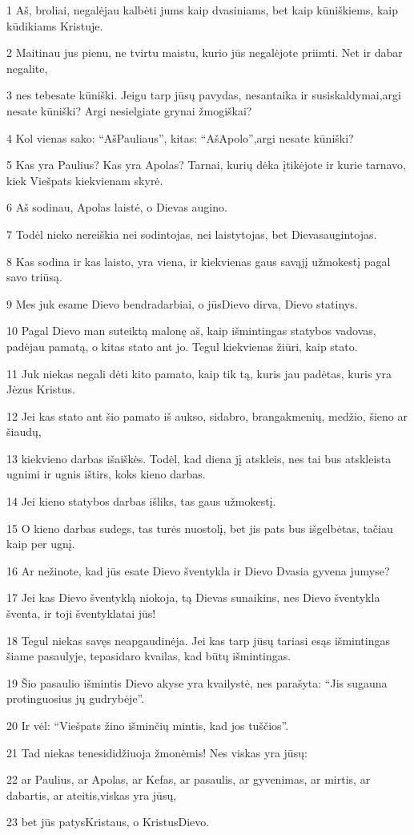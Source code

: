 \par 1 Aš, broliai, negalėjau kalbėti jums kaip dvasiniams, bet kaip kūniškiems, kaip kūdikiams Kristuje. 
\par 2 Maitinau jus pienu, ne tvirtu maistu, kurio jūs negalėjote priimti. Net ir dabar negalite, 
\par 3 nes tebesate kūniški. Jeigu tarp jūsų pavydas, nesantaika ir susiskaldymai,­argi nesate kūniški? Argi nesielgiate grynai žmogiškai? 
\par 4 Kol vienas sako: “Aš­Pauliaus”, kitas: “Aš­Apolo”,­argi nesate kūniški? 
\par 5 Kas yra Paulius? Kas yra Apolas? Tarnai, kurių dėka įtikėjote ir kurie tarnavo, kiek Viešpats kiekvienam skyrė. 
\par 6 Aš sodinau, Apolas laistė, o Dievas augino. 
\par 7 Todėl nieko nereiškia nei sodintojas, nei laistytojas, bet Dievas­augintojas. 
\par 8 Kas sodina ir kas laisto, yra viena, ir kiekvienas gaus savąjį užmokestį pagal savo triūsą. 
\par 9 Mes juk esame Dievo bendradarbiai, o jūs­Dievo dirva, Dievo statinys. 
\par 10 Pagal Dievo man suteiktą malonę aš, kaip išmintingas statybos vadovas, padėjau pamatą, o kitas stato ant jo. Tegul kiekvienas žiūri, kaip stato. 
\par 11 Juk niekas negali dėti kito pamato, kaip tik tą, kuris jau padėtas, kuris yra Jėzus Kristus. 
\par 12 Jei kas stato ant šio pamato iš aukso, sidabro, brangakmenių, medžio, šieno ar šiaudų,­ 
\par 13 kiekvieno darbas išaiškės. Todėl, kad diena jį atskleis, nes tai bus atskleista ugnimi ir ugnis ištirs, koks kieno darbas. 
\par 14 Jei kieno statybos darbas išliks, tas gaus užmokestį. 
\par 15 O kieno darbas sudegs, tas turės nuostolį, bet jis pats bus išgelbėtas, tačiau kaip per ugnį. 
\par 16 Ar nežinote, kad jūs esate Dievo šventykla ir Dievo Dvasia gyvena jumyse? 
\par 17 Jei kas Dievo šventyklą niokoja, tą Dievas sunaikins, nes Dievo šventykla šventa, ir toji šventykla­tai jūs! 
\par 18 Tegul niekas savęs neapgaudinėja. Jei kas tarp jūsų tariasi esąs išmintingas šiame pasaulyje, tepasidaro kvailas, kad būtų išmintingas. 
\par 19 Šio pasaulio išmintis Dievo akyse yra kvailystė, nes parašyta: “Jis sugauna protinguosius jų gudrybėje”. 
\par 20 Ir vėl: “Viešpats žino išminčių mintis, kad jos tuščios”. 
\par 21 Tad niekas tenesididžiuoja žmonėmis! Nes viskas yra jūsų: 
\par 22 ar Paulius, ar Apolas, ar Kefas, ar pasaulis, ar gyvenimas, ar mirtis, ar dabartis, ar ateitis,­viskas yra jūsų, 
\par 23 bet jūs patys­Kristaus, o Kristus­Dievo.


